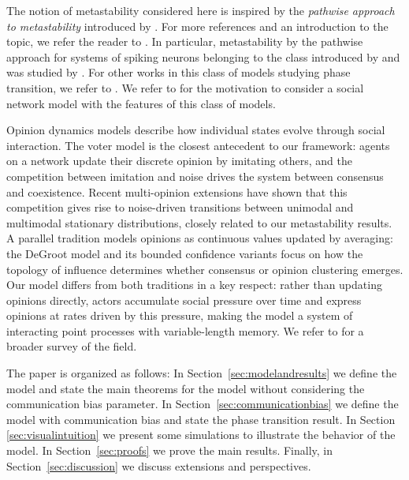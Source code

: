 \documentclass[11pt]{article}
\theoremstyle{definition}
\begin{document}
The notion of metastability considered here is inspired by the \textit{pathwise approach to metastability}
introduced by \cite{cassandro}. 
For more references and an introduction to the topic, we refer the reader to \cite{metabook}.
In particular, metastability by the pathwise approach for systems of spiking neurons belonging to the class introduced by \cite{glmodel} and \cite{gl4} was studied by \cite{mandre1,mandre2,taille,evamonm,mandre3,laxa}. For other works in this class of models studying phase transition, we refer to  \cite{brochiniphasetransition,gl2, amarcos}. We refer to \cite{galves2024fastconsensusmetastabilityhighly}
for the motivation to consider a social network model with the features of this class of models.

Opinion dynamics models describe how individual states evolve through social interaction. The voter model \cite{Liggett1985} is the closest antecedent to our framework: agents on a network update their discrete opinion by imitating others, and the competition between imitation and noise drives the system between consensus and coexistence. Recent multi-opinion extensions \cite{HerrerasAzcue2019} have shown that this competition gives rise to noise-driven transitions between unimodal and multimodal stationary distributions, closely related to our metastability results. A parallel tradition models opinions as continuous values updated by averaging: the DeGroot model \cite{DeGroot1974} and its bounded confidence variants \cite{Deffuant2000, HegselmannKrause2002} focus on how the topology of influence determines whether consensus or opinion clustering emerges. Our model differs from both traditions in a key respect: rather than updating opinions directly, actors accumulate social pressure over time and express opinions at rates driven by this pressure, making the model a system of interacting point processes with variable-length memory. We refer to \cite{Peralta2022} for a broader survey of the field.

The paper is organized as follows: In Section~\ref{sec:modelandresults} we define the model and state the main theorems for the model without considering the communication bias parameter.  In Section~\ref{sec:communicationbias} we define the model with communication bias and state the phase transition result. In Section \ref{sec:visualintuition} we present some simulations to illustrate the behavior of the model. In Section~\ref{sec:proofs} we prove the main results. Finally, in Section~\ref{sec:discussion} we discuss extensions and perspectives.
\end{document}
